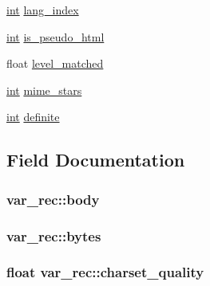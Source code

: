 \begin{DoxyCompactItemize}
\hyperlink{pcre_8txt_a42dfa4ff673c82d8efe7144098fbc198}{int} \hyperlink{structvar__rec_a530e006fea39e1c90b77c9274160e9ea}{lang\+\_\+index}
\item 
\hyperlink{pcre_8txt_a42dfa4ff673c82d8efe7144098fbc198}{int} \hyperlink{structvar__rec_acefbd03dd511f2ed40e5a4cb267c5f8f}{is\+\_\+pseudo\+\_\+html}
\item 
float \hyperlink{structvar__rec_ac5c8089312d8184945ff4aff6ff8e59c}{level\+\_\+matched}
\item 
\hyperlink{pcre_8txt_a42dfa4ff673c82d8efe7144098fbc198}{int} \hyperlink{structvar__rec_a885994c5e09893d7cde31df8155b3801}{mime\+\_\+stars}
\item 
\hyperlink{pcre_8txt_a42dfa4ff673c82d8efe7144098fbc198}{int} \hyperlink{structvar__rec_ab686e54e401e2bf2a48bec6822c58caa}{definite}
\end{DoxyCompactItemize}


\subsection{Field Documentation}
\subsubsection[{\texorpdfstring{body}{body}}]{ var\+\_\+rec\+::body}\hypertarget{structvar__rec_a536f18c02f976bda1f0cd939b7a3e0b3}{}\label{structvar__rec_a536f18c02f976bda1f0cd939b7a3e0b3}
\subsubsection[{\texorpdfstring{bytes}{bytes}}]{ var\+\_\+rec\+::bytes}\hypertarget{structvar__rec_a04607cd44f1869d294b8c1476e9dbc2f}{}\label{structvar__rec_a04607cd44f1869d294b8c1476e9dbc2f}
\subsubsection[{\texorpdfstring{charset\+\_\+quality}{charset_quality}}]{\setlength{\rightskip}{0pt plus 5cm}float var\+\_\+rec\+::charset\+\_\+quality}\hypertarget{structvar__rec_af4598a948f5d2d2fba013d69665c0bb0}{}\label{structvar__rec_af4598a948f5d2d2fba013d69665c0bb0}
